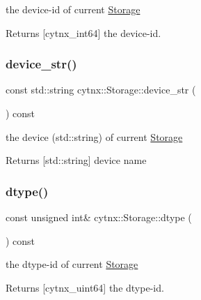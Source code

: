 the device-\/id of current \hyperlink{classcytnx_1_1Storage}{Storage} 

\begin{DoxyReturn}{Returns}
\mbox{[}cytnx\+\_\+int64\mbox{]} the device-\/id. 
\end{DoxyReturn}
\mbox{\label{classcytnx_1_1Storage_ae0d90d5275fa7e52a0a2dc10512ba71f}} 
\subsubsection{\texorpdfstring{device\+\_\+str()}{device\_str()}}
{\footnotesize\ttfamily const std\+::string cytnx\+::\+Storage\+::device\+\_\+str (\begin{DoxyParamCaption}{ }\end{DoxyParamCaption}) const\hspace{0.3cm}{\ttfamily [inline]}}



the device (std\+::string) of current \hyperlink{classcytnx_1_1Storage}{Storage} 

\begin{DoxyReturn}{Returns}
\mbox{[}std\+::string\mbox{]} device name 
\end{DoxyReturn}
\mbox{\label{classcytnx_1_1Storage_a643824801e81ab86aca055f1dd1f34d7}} 
\subsubsection{\texorpdfstring{dtype()}{dtype()}}
{\footnotesize\ttfamily const unsigned int\& cytnx\+::\+Storage\+::dtype (\begin{DoxyParamCaption}{ }\end{DoxyParamCaption}) const\hspace{0.3cm}{\ttfamily [inline]}}



the dtype-\/id of current \hyperlink{classcytnx_1_1Storage}{Storage} 

\begin{DoxyReturn}{Returns}
\mbox{[}cytnx\+\_\+uint64\mbox{]} the dtype-\/id. 
\end{DoxyReturn}
\mbox{\label{classcytnx_1_1Storage_ab6e9fb01ad4655701a2d54dc978eef17}} 
